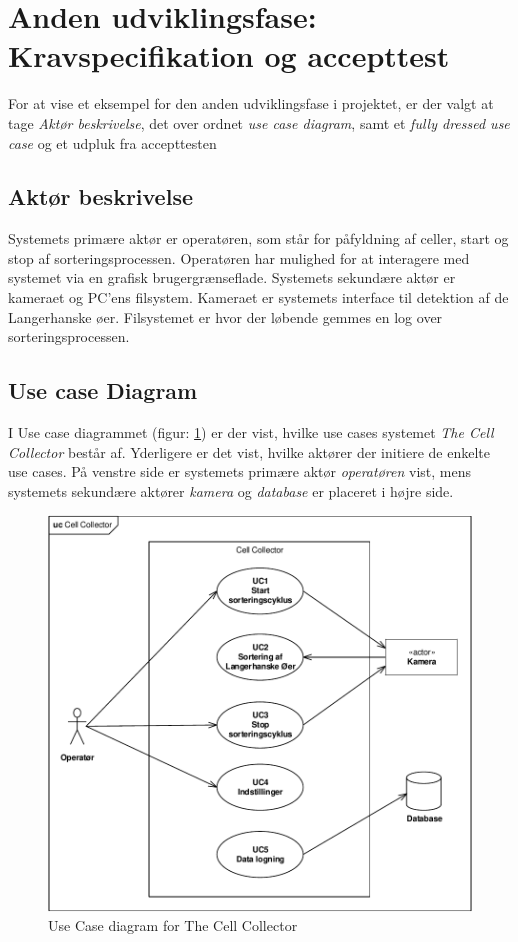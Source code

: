 \section{Anden udviklingsfase: Kravspecifikation og accepttest}
\label{subsec:krav}
For at vise et eksempel for den anden udviklingsfase i projektet, er der valgt at tage \textit{Aktør beskrivelse}, det over ordnet \textit{use case diagram}, samt et \textit{fully dressed use case} og et udpluk fra accepttesten


\subsection{Aktør beskrivelse}
Systemets primære aktør er operatøren, som står for påfyldning af celler, start og stop af sorteringsprocessen. Operatøren har mulighed for at interagere med systemet via en grafisk brugergrænseflade. Systemets sekundære aktør er kameraet og PC’ens filsystem. Kameraet er systemets interface til detektion af de Langerhanske øer. Filsystemet er hvor der løbende gemmes en log over sorteringsprocessen.
\newpage
\subsection{Use case Diagram}
I Use case diagrammet (figur: \ref{fig:usecase}) er der vist, hvilke use cases systemet \textit{The Cell Collector} består af. Yderligere er det vist, hvilke aktører der initiere de enkelte use cases. På venstre side er systemets primære aktør \textit{operatøren} vist, mens systemets sekundære aktører \textit{kamera} og \textit{database} er placeret i højre side. 

\begin{figure}[H]
	\centering
	\includegraphics[width=1\textwidth]{billeder/UC_CellCollector.pdf}
	\caption{Use Case diagram for The Cell Collector}
	\label{fig:usecase}
\end{figure}

